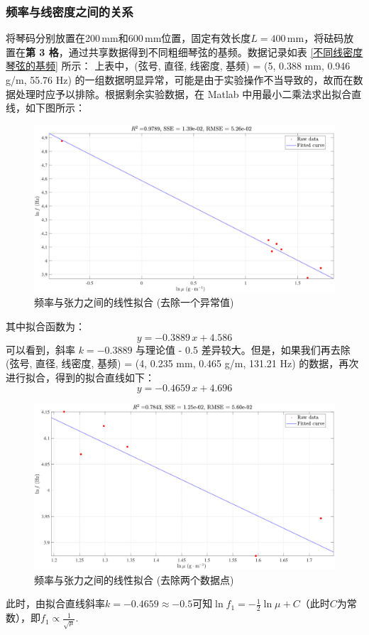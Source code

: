 \documentclass[UTF8]{article}
\theoremstyle{MyLineTheoremStyle} %
\theoremstyle{MyBlockTheoremStyle} %
\theoremstyle{MySubsubsectionStyle} %
\begin{document}
\subsubsection{频率与线密度之间的关系}
将琴码分别放置在200\,mm和600\,mm位置，固定有效长度$ L=400\,\mathrm{mm} $，将砝码放置在\textbf{第 3 格}，通过共享数据得到不同粗细琴弦的基频。数据记录如表 \ref{不同线密度琴弦的基频} 所示：
上表中，(弦号, 直径, 线密度, 基频) = (5, 0.388 mm, 0.946 g/m, 55.76 Hz) 的一组数据明显异常，可能是由于实验操作不当导致的，故而在数据处理时应予以排除。根据剩余实验数据，在 Matlab 中用最小二乘法求出拟合直线，如下图所示：
\begin{figure}[H]\centering
    \includegraphics[width=0.9\columnwidth]{assets/5.pdf}
    \caption{频率与张力之间的线性拟合 (去除一个异常值)}
\end{figure}
其中拟合函数为：
\begin{equation}
y = -0.3889 \, x + 4.586
\end{equation}
可以看到，斜率 $k = -0.3889$ 与理论值 - 0.5 差异较大。但是，如果我们再去除 (弦号, 直径, 线密度, 基频) = (4, 0.235 mm, 0.465 g/m, 131.21 Hz) 的数据，再次进行拟合，得到的拟合直线如下：
\begin{equation}
y = -0.4659 \, x + 4.696
\end{equation}
\begin{figure}[H]\centering
    \includegraphics[width=0.9\columnwidth]{assets/6.pdf}
    \caption{频率与张力之间的线性拟合 (去除两个数据点)}
\end{figure}
此时，由拟合直线斜率$ k=-0.4659\approx- 0.5 $可知$ \ln f_1=-\frac12\ln\mu+C $（此时$ C $为常数），即$ f_1\propto\frac{1}{\sqrt \mu} $.
\end{document}

